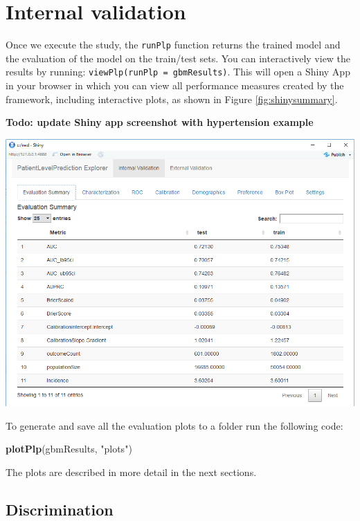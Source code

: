 \documentclass[]{book}
\newenvironment{Shaded}{\begin{snugshade}}{\end{snugshade}}
\newcommand{\KeywordTok}[1]{\textcolor[rgb]{0.13,0.29,0.53}{\textbf{#1}}}
\newcommand{\StringTok}[1]{\textcolor[rgb]{0.31,0.60,0.02}{#1}}
\newcommand{\NormalTok}[1]{#1}
\begin{document}
\section{Internal validation}\label{internal-validation}

Once we execute the study, the \texttt{runPlp} function returns the
trained model and the evaluation of the model on the train/test sets.
You can interactively view the results by running:
\texttt{viewPlp(runPlp\ =\ gbmResults)}. This will open a Shiny App in
your browser in which you can view all performance measures created by
the framework, including interactive plots, as shown in Figure
\ref{fig:shinysummary}.

\textbf{Todo: update Shiny app screenshot with hypertension example}

\includegraphics[width=1\linewidth]{images/PatientLevelPrediction/shinysummary}

To generate and save all the evaluation plots to a folder run the
following code:

\begin{Shaded}
\begin{Highlighting}[]
\KeywordTok{plotPlp}\NormalTok{(gbmResults, }\StringTok{"plots"}\NormalTok{)}
\end{Highlighting}
\end{Shaded}

The plots are described in more detail in the next sections.

\subsection{Discrimination}\label{discrimination}
\end{document}
